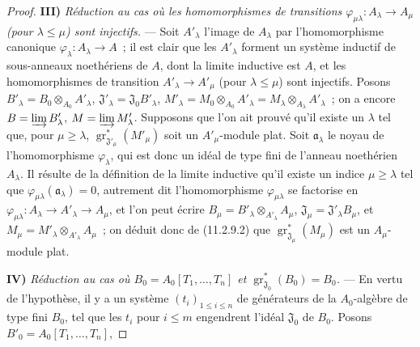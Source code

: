 \begin{proof}
\medskip
\noindent\textbf{III)} \emph{Réduction au cas où les homomorphismes de
transitions $\varphi_{\mu\lambda}:A_\lambda\to A_\mu$ (pour
$\lambda\leq\mu$) sont injectifs.} --- Soit $A'_\lambda$ l'image de
$A_\lambda$ par l'homomorphisme canonique $\varphi_\lambda:A_\lambda\to A$~;
il est clair que les $A'_\lambda$ forment un système inductif de sous-anneaux
noethériens de $A$, dont la limite inductive est $A$, et les homomorphismes de
transition $A'_\lambda\to A'_\mu$ (pour $\lambda\leq\mu$) sont injectifs.
Posons $B'_\lambda=B_0\otimes_{A_0}A'_\lambda$,
$\mathfrak J'_\lambda=\mathfrak J_0B'_\lambda$,
$M'_\lambda=M_0\otimes_{A_0}A'_\lambda=M_\lambda\otimes_{A_\lambda}A'_\lambda$~;
on a encore $B=\varinjlim B'_\lambda$, $M=\varinjlim M'_\lambda$. Supposons
que l'on ait prouvé qu'il existe un $\lambda$ tel que, pour $\mu\geq\lambda$,
$\operatorname{gr}_{\mathfrak J'_\mu}^*(M'_\mu)$ soit un $A'_\mu$-module
plat. Soit $\mathfrak a_\lambda$ le noyau de l'homomorphisme $\varphi_\lambda$,
qui est donc un idéal de type fini de l'anneau noethérien $A_\lambda$. Il
résulte de la définition de la limite inductive qu'il existe un indice
$\mu\geq\lambda$ tel que $\varphi_{\mu\lambda}(\mathfrak a_\lambda)=0$,
autrement dit l'homomorphisme $\varphi_{\mu\lambda}$ se factorise en
$\varphi_{\mu\lambda}:A_\lambda\to A'_\lambda\to A_\mu$, et l'on peut écrire
$B_\mu=B'_\lambda\otimes_{A'_\lambda}A_\mu$,
$\mathfrak J_\mu=\mathfrak J'_\lambda B_\mu$, et
$M_\mu=M'_\lambda\otimes_{A'_\lambda}A_\mu$~; on déduit donc de (11.2.9.2)
que $\operatorname{gr}_{\mathfrak J_\mu}^*(M_\mu)$ est un $A_\mu$-module
plat.

\medskip
\noindent\textbf{IV)} \emph{Réduction au cas où
$B_0=A_0[T_1,\ldots,T_n]$ et
$\operatorname{gr}_{\mathfrak J_0}^*(B_0)=B_0$.} --- En vertu de l'hypothèse,
il y a un système $(t_i)_{1\leq i\leq n}$ de générateurs de la $A_0$-algèbre
de type fini $B_0$, tel que les $t_i$ pour $i\leq m$ engendrent l'idéal
$\mathfrak J_0$ de $B_0$. Posons $B'_0=A_0[T_1,\ldots,T_n]$,



\end{proof}
